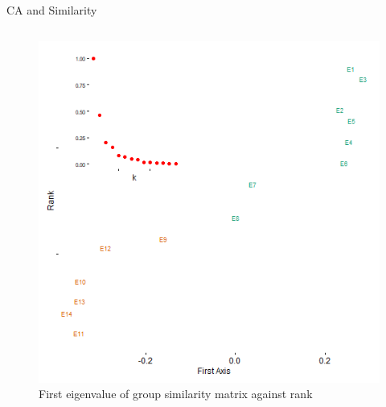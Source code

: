 \documentclass[
  ignorenonframetext,
]{beamer}
\begin{document}
\begin{frame}{CA and Similarity}
\begin{columns}[T]
\begin{column}{0.5\textwidth}
\begin{figure}
{\centering \includegraphics{Plots/ca-eigvec-g.png}

}

\caption{First eigenvalue of group similarity matrix against rank}

\end{figure}
\end{column}
\end{columns}
\end{frame}
\end{document}
